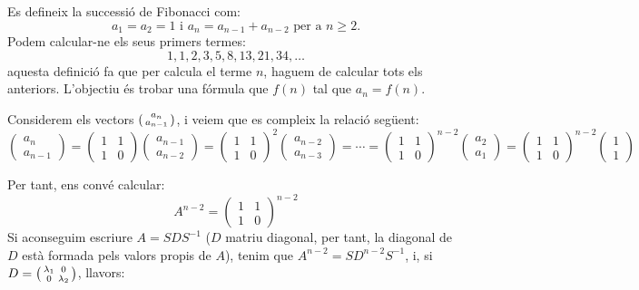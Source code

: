 \begin{exemple}
Es defineix la successió de Fibonacci com:
\[
a_1=a_2=1 \text{ i } a_{n}=a_{n-1}+a_{n-2} \text{ per a $n\geq 2$}.
\]
Podem calcular-ne els seus primers termes:
$$
1, 1, 2, 3, 5, 8, 13, 21, 34, \dots
$$
aquesta definició fa que per calcula el terme $n$, haguem de calcular tots els anteriors. L'objectiu és trobar una fórmula que $f(n)$ tal que $a_n=f(n)$.

Considerem els vectors $\left(\begin{smallmatrix}a_{n}\\a_{n-1}\end{smallmatrix}\right)$, i veiem que es compleix la relació següent:
\[
\begin{pmatrix}
a_{n}\\a_{n-1}
\end{pmatrix}=
\begin{pmatrix}
1 & 1\\1 & 0
\end{pmatrix}
\begin{pmatrix}
a_{n-1}\\a_{n-2}
\end{pmatrix}=
\begin{pmatrix}
1 & 1\\1 & 0
\end{pmatrix}^2
\begin{pmatrix}
a_{n-2}\\a_{n-3}
\end{pmatrix}= \cdots =
\begin{pmatrix}
1 & 1\\1 & 0
\end{pmatrix}^{n-2}
\begin{pmatrix}
a_{2}\\a_{1}
\end{pmatrix}=
\begin{pmatrix}
1 & 1\\1 & 0
\end{pmatrix}^{n-2}
\begin{pmatrix}
1\\ 1
\end{pmatrix}
\]
\end{exemple}
Per tant, ens convé calcular:
\[ A^{n-2}=
\begin{pmatrix}
1 & 1\\1 & 0
\end{pmatrix}^{n-2}
\]
Si aconseguim escriure $A=SDS^{-1}$ ($D$ matriu diagonal, per tant, la diagonal de $D$ està formada pels valors propis de $A$), tenim que $A^{n-2}=SD^{n-2}S^{-1}$, i, si $D=\left(\begin{smallmatrix}\lambda_1 & 0 \\ 0 & \lambda_2\end{smallmatrix}\right)$, llavors:
